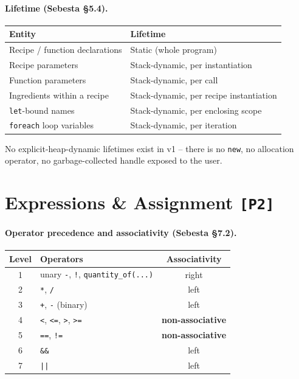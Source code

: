 \documentclass[11pt,a4paper]{article}
\begin{document}
\paragraph{Lifetime (Sebesta \S5.4).}

\begin{center}
\begin{tabular}{@{}ll@{}}
\toprule
\textbf{Entity} & \textbf{Lifetime} \\
\midrule
Recipe / function declarations          & Static (whole program) \\
Recipe parameters                       & Stack-dynamic, per instantiation \\
Function parameters                     & Stack-dynamic, per call \\
Ingredients within a recipe             & Stack-dynamic, per recipe instantiation \\
\texttt{let}-bound names                & Stack-dynamic, per enclosing scope \\
\texttt{foreach} loop variables         & Stack-dynamic, per iteration \\
\bottomrule
\end{tabular}
\end{center}

\noindent No explicit-heap-dynamic lifetimes exist in v1 -- there is
no \texttt{new}, no allocation operator, no garbage-collected handle
exposed to the user.


\section{Expressions \& Assignment \texttt{[P2]}}

\paragraph{Operator precedence and associativity (Sebesta \S7.2).}

\begin{center}
\begin{tabular}{@{}clc@{}}
\toprule
\textbf{Level} & \textbf{Operators} & \textbf{Associativity} \\
\midrule
1 & unary \texttt{-}, \texttt{!}, \texttt{quantity\_of(...)} & right \\
2 & \texttt{*}, \texttt{/}                                    & left \\
3 & \texttt{+}, \texttt{-} (binary)                           & left \\
4 & \texttt{<}, \texttt{<=}, \texttt{>}, \texttt{>=}          & \textbf{non-associative} \\
5 & \texttt{==}, \texttt{!=}                                  & \textbf{non-associative} \\
6 & \texttt{\&\&}                                             & left \\
7 & \texttt{||}                                               & left \\
\bottomrule
\end{tabular}
\end{center}
\end{document}
